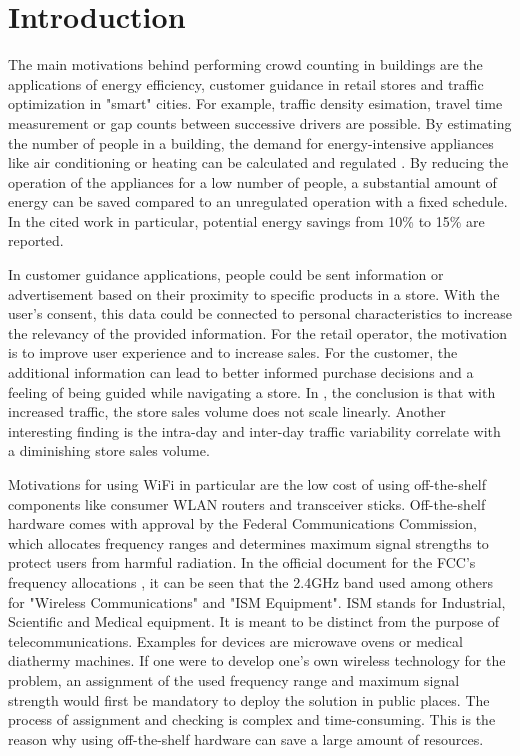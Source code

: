\documentclass[conference]{IEEEtran}
\begin{document}
\section{Introduction}
The main motivations behind performing crowd counting in buildings are the applications of energy efficiency, customer guidance in retail stores and traffic optimization in "smart" cities. For example, traffic density esimation, travel time measurement or gap counts between successive drivers are possible. By estimating the number of people in a building, the demand for energy-intensive appliances like air conditioning or heating can be calculated and regulated \cite{Agarwal}. By reducing the operation of the appliances for a low number of people, a substantial amount of energy can be saved compared to an unregulated operation with a fixed schedule. In the cited work in particular, potential energy savings from 10\% to 15\% are reported.
\par
In customer guidance applications, people could be sent information or advertisement based on their proximity to specific products in a store. With the user's consent, this data could be connected to personal characteristics to increase the relevancy of the provided information. For the retail operator, the motivation is to improve user experience and to increase sales. For the customer, the additional information can lead to better informed purchase decisions and a feeling of being guided while navigating a store.
In \cite{RetailStores}, the conclusion is that with increased traffic, the store sales volume does not scale linearly. Another interesting finding is the intra-day and inter-day traffic variability correlate with a diminishing store sales volume.
\par
Motivations for using WiFi in particular are the low cost of using off-the-shelf components like consumer WLAN routers and transceiver sticks. Off-the-shelf hardware comes with approval by the Federal Communications Commission, which allocates frequency ranges and determines maximum signal strengths to protect users from harmful radiation. In the official document for the FCC's frequency allocations \cite{fcctable}, it can be seen that the 2.4GHz band used among others for "Wireless Communications" and "ISM Equipment". ISM stands for Industrial, Scientific and Medical equipment. It is meant to be distinct from the purpose of telecommunications. Examples for devices are microwave ovens or medical diathermy machines.
If one were to develop one's own wireless technology for the problem, an assignment of the used frequency range and maximum signal strength would first be mandatory to deploy the solution in public places. The process of assignment and checking is complex and time-consuming. This is the reason why using off-the-shelf hardware can save a large amount of resources.
\end{document}
